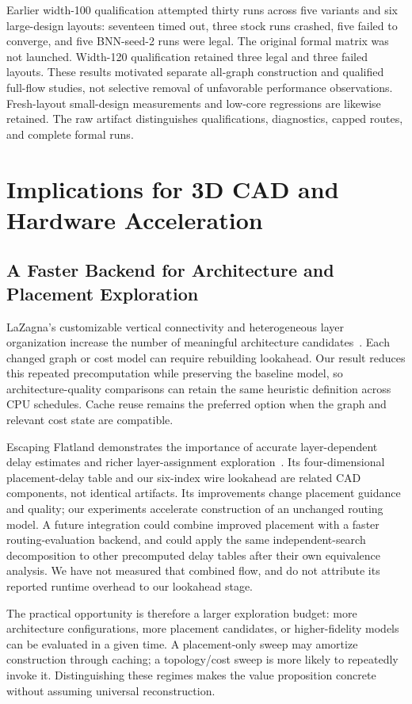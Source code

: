 \documentclass[conference,10pt,letterpaper]{IEEEtran}
\begin{document}
Earlier width-100 qualification attempted thirty runs across five variants and six large-design layouts: seventeen timed out, three stock runs crashed, five failed to converge, and five BNN-seed-2 runs were legal. The original formal matrix was not launched. Width-120 qualification retained three legal and three failed layouts. These results motivated separate all-graph construction and qualified full-flow studies, not selective removal of unfavorable performance observations. Fresh-layout small-design measurements and low-core regressions are likewise retained. The raw artifact distinguishes qualifications, diagnostics, capped routes, and complete formal runs.

\section{Implications for 3D CAD and Hardware Acceleration}
\subsection{A Faster Backend for Architecture and Placement Exploration}
LaZagna's customizable vertical connectivity and heterogeneous layer organization increase the number of meaningful architecture candidates~\cite{lazagna}. Each changed graph or cost model can require rebuilding lookahead. Our result reduces this repeated precomputation while preserving the baseline model, so architecture-quality comparisons can retain the same heuristic definition across CPU schedules. Cache reuse remains the preferred option when the graph and relevant cost state are compatible.

Escaping Flatland demonstrates the importance of accurate layer-dependent delay estimates and richer layer-assignment exploration~\cite{flatland}. Its four-dimensional placement-delay table and our six-index wire lookahead are related CAD components, not identical artifacts. Its improvements change placement guidance and quality; our experiments accelerate construction of an unchanged routing model. A future integration could combine improved placement with a faster routing-evaluation backend, and could apply the same independent-search decomposition to other precomputed delay tables after their own equivalence analysis. We have not measured that combined flow, and do not attribute its reported runtime overhead to our lookahead stage.

The practical opportunity is therefore a larger exploration budget: more architecture configurations, more placement candidates, or higher-fidelity models can be evaluated in a given time. A placement-only sweep may amortize construction through caching; a topology/cost sweep is more likely to repeatedly invoke it. Distinguishing these regimes makes the value proposition concrete without assuming universal reconstruction.
\end{document}
